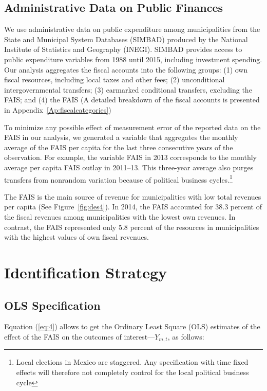\documentclass[dv_diss_main.tex]{subfiles}
\begin{document}
    \subsection {Administrative Data on Public Finances} \label{subsec:adminis}


We use administrative data on public expenditure among municipalities from the State and Municipal System Databases (SIMBAD) produced by the National Institute of Statistics and Geography (INEGI). SIMBAD provides access to public expenditure variables from 1988 until 2015, including investment spending. Our analysis aggregates the fiscal accounts into the following groups: (1) own fiscal resources, including local taxes and other fees; (2) unconditional intergovernmental transfers; (3) earmarked conditional transfers, excluding the FAIS; and (4)  the  FAIS  (A detailed breakdown of the fiscal accounts is presented in {Appendix}~\ref{Ap:fiscalcategories})

To minimize any possible effect of measurement error of the reported data on the FAIS in our analysis, we generated a variable that aggregates the monthly average of the FAIS per capita for the last three consecutive years of the observation. For example, the variable FAIS in 2013 corresponds to the monthly average per capita FAIS outlay in 2011–13. This three-year average also purges transfers from nonrandom variation because of political business cycles.\footnote{ Local elections in Mexico are staggered. Any specification with time fixed effects will therefore not completely control for the local political business cycle}

The FAIS is the main source of revenue for municipalities with low total revenues per capita (See Figure~\ref{fig:des4}). In 2014, the FAIS accounted for 38.3 percent of the fiscal revenues among municipalities with the lowest own revenues. In contrast, the FAIS represented only 5.8 percent of the resources in municipalities with the highest values of own fiscal revenues.



    \section {Identification Strategy} \label{sec:strategy}
    \subsection {OLS Specification} \label{subsec:ols}


Equation (\ref{eq:4}) allows to get the Ordinary Least Square (OLS) estimates of the effect of the FAIS on the outcomes of interest---$Y_{m,t}$, as follows:
\end{document}
